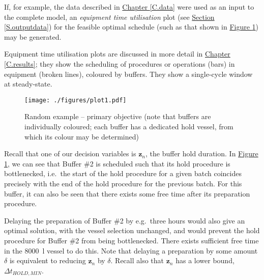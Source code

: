 If, for example, the data described in
\hyperref[C.data]{Chapter \ref*{C.data}} were used as an input to the complete
model, an \emph{equipment time utilisation} plot (see
\hyperref[S.outputdata]{Section \ref*{S.outputdata}}) for the feasible optimal
schedule (such as that shown in 
\hyperref[fig.primary]{Figure \ref*{fig.primary}})
may be generated.

Equipment time utilisation plots are discussed in more detail in
\hyperref[C.results]{Chapter \ref*{C.results}}; they show the scheduling of
procedures or operations (bars) in equipment (broken lines), coloured by
buffers. They show a single-cycle window at steady-state.

\begin{figure}
    \centering
    \texttt{[image: ./figures/plot1.pdf]}
    \caption{Random example -- primary objective (note that buffers are
        individually coloured; each buffer has a dedicated hold vessel, from
        which its colour may be determined)}
    \label{fig.primary}
\end{figure}
 
Recall that one of our decision variables is $\boldsymbol{z}_{n}$, the buffer
hold duration.
In \hyperref[fig.primary]{Figure \ref*{fig.primary}}, we can see that Buffer
\#2 is scheduled such that its hold procedure is bottlenecked, i.e.\ the start
of the hold procedure for a given batch coincides precisely with the end of the
hold procedure for the previous batch.
For this buffer, it can also be seen that there exists some free time after
its preparation procedure.

Delaying the preparation of Buffer \#2 by e.g.\ three hours would
also give an optimal solution, with the vessel selection unchanged, and would
prevent the hold procedure for Buffer \#2 from being bottlenecked.
There exists sufficient free time in the \SI{8000}{\litre} vessel to do this.
Note that delaying a preparation by some amount $\delta$ is equivalent to 
reducing $\boldsymbol{z}_{n}$ by $\delta$.
Recall also that $\boldsymbol{z}_{n}$ has a lower bound, 
$\Delta t_{\mathit{HOLD,MIN}}$.

